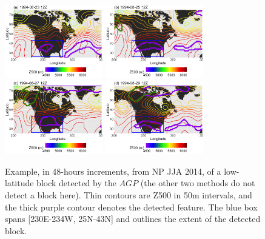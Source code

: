 \documentclass[smallextended]{svjour3}       %
\numberwithin{equation}{section}
\begin{document}
\begin{figure}
\centering
\includegraphics[width=0.38\textwidth]{fig14a}
\includegraphics[width=0.38\textwidth]{fig14b}\\
\includegraphics[width=0.38\textwidth]{fig14c}
\includegraphics[width=0.38\textwidth]{fig14d}
\caption{Example, in 48-hours increments, from NP JJA 2014, of a low-latitude block detected by the $AGP$ (the other two methods do not detect a block here). Thin contours are Z500 in 50m intervals, and the thick purple contour denotes the detected feature. The blue box spans [230E-234W, 25N-43N] and outlines the extent of the detected block.
}\label{lowlatjja}
\end{figure} 
\end{document}

